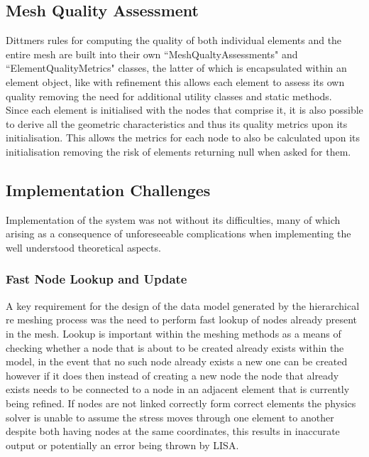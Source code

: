\subsection{Mesh Quality Assessment}
Dittmers rules for computing the quality of both individual elements and the entire mesh are built into their own ``MeshQualtyAssessments" and ``ElementQualityMetrics" classes, the latter of which is encapsulated within an element object, like with refinement this allows each element to assess its own quality removing the need for additional utility classes and static methods. \\

\noindent
Since each element is initialised with the nodes that comprise it, it is also possible to derive all the geometric characteristics and thus its quality metrics upon its initialisation. This allows the metrics for each node to also be calculated upon its initialisation removing the risk of elements returning null when asked for them.





\subsection{Implementation Challenges}
Implementation of the system was not without its difficulties, many of which arising as a consequence of unforeseeable complications when implementing the well understood theoretical aspects. 

\subsubsection{Fast Node Lookup and Update}
A key requirement for the design of the data model generated by the hierarchical re meshing process was the need to perform fast lookup of nodes already present in the mesh. Lookup is important within the meshing methods as a means of checking whether a node that is about to be created already exists within the model, in the event that no such node already exists a new one can be created however if it does then instead of creating a new node the node that already exists needs to be connected to a node in an adjacent element that is currently being refined. If nodes are not linked correctly form correct elements the physics solver is unable to assume the stress moves through one element to another despite both having nodes at the same coordinates, this results in inaccurate output or potentially an error being thrown by LISA. \\ 

